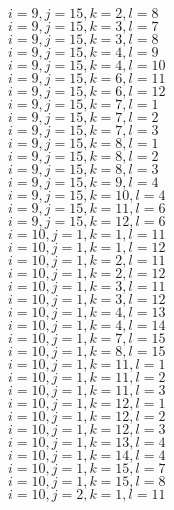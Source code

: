 \documentclass[14pt]{article}
\begin{document}
    $i=9,j=15,k=2,l=8 $ \\ 
    $i=9,j=15,k=3,l=7 $ \\ 
    $i=9,j=15,k=3,l=8 $ \\ 
    $i=9,j=15,k=4,l=9 $ \\ 
    $i=9,j=15,k=4,l=10 $ \\ 
    $i=9,j=15,k=6,l=11 $ \\ 
    $i=9,j=15,k=6,l=12 $ \\ 
    $i=9,j=15,k=7,l=1 $ \\ 
    $i=9,j=15,k=7,l=2 $ \\ 
    $i=9,j=15,k=7,l=3 $ \\ 
    $i=9,j=15,k=8,l=1 $ \\ 
    $i=9,j=15,k=8,l=2 $ \\ 
    $i=9,j=15,k=8,l=3 $ \\ 
    $i=9,j=15,k=9,l=4 $ \\ 
    $i=9,j=15,k=10,l=4 $ \\ 
    $i=9,j=15,k=11,l=6 $ \\ 
    $i=9,j=15,k=12,l=6 $ \\ 
    $i=10,j=1,k=1,l=11 $ \\ 
    $i=10,j=1,k=1,l=12 $ \\ 
    $i=10,j=1,k=2,l=11 $ \\ 
    $i=10,j=1,k=2,l=12 $ \\ 
    $i=10,j=1,k=3,l=11 $ \\ 
    $i=10,j=1,k=3,l=12 $ \\ 
    $i=10,j=1,k=4,l=13 $ \\ 
    $i=10,j=1,k=4,l=14 $ \\ 
    $i=10,j=1,k=7,l=15 $ \\ 
    $i=10,j=1,k=8,l=15 $ \\ 
    $i=10,j=1,k=11,l=1 $ \\ 
    $i=10,j=1,k=11,l=2 $ \\ 
    $i=10,j=1,k=11,l=3 $ \\ 
    $i=10,j=1,k=12,l=1 $ \\ 
    $i=10,j=1,k=12,l=2 $ \\ 
    $i=10,j=1,k=12,l=3 $ \\ 
    $i=10,j=1,k=13,l=4 $ \\ 
    $i=10,j=1,k=14,l=4 $ \\ 
    $i=10,j=1,k=15,l=7 $ \\ 
    $i=10,j=1,k=15,l=8 $ \\ 
    $i=10,j=2,k=1,l=11 $ \\ 
\end{document}
